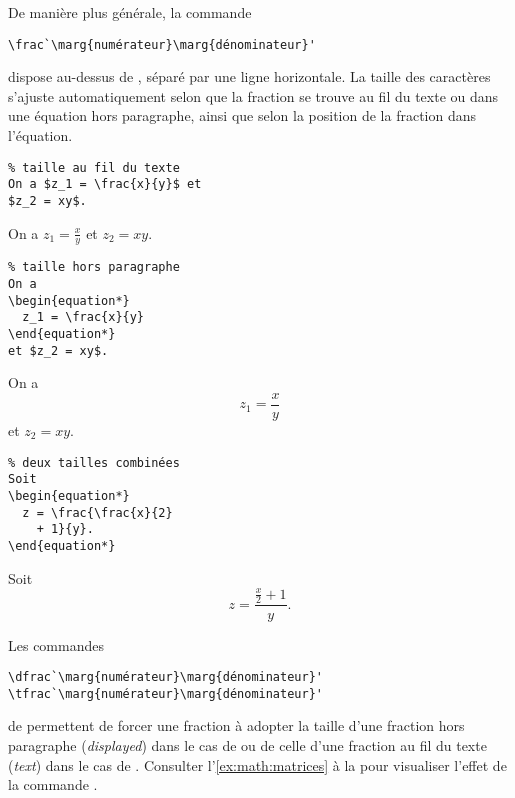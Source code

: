 De manière plus générale, la commande
\begin{lstlisting}
\frac`\marg{numérateur}\marg{dénominateur}'
\end{lstlisting}
dispose  au-dessus de , séparé par
une ligne horizontale. La taille des caractères s'ajuste
automatiquement selon que la fraction se trouve au fil du texte ou
dans une équation hors paragraphe, ainsi que selon la position de la
fraction dans l'équation.
\begin{demo}
  \begin{texample}
\begin{lstlisting}
% taille au fil du texte
On a $z_1 = \frac{x}{y}$ et
$z_2 = xy$.
\end{lstlisting}
    \producing On a $z_1 = \frac{x}{y}$ et $z_2 = xy$.
  \end{texample}

  \begin{texample}
\begin{lstlisting}
% taille hors paragraphe
On a
\begin{equation*}
  z_1 = \frac{x}{y}
\end{equation*}
et $z_2 = xy$.
\end{lstlisting}
    \producing On a
    \begin{equation*}
      z_1 = \frac{x}{y}
    \end{equation*}
    et $z_2 = xy$.
  \end{texample}

  \begin{texample}
\begin{lstlisting}
% deux tailles combinées
Soit
\begin{equation*}
  z = \frac{\frac{x}{2}
    + 1}{y}.
\end{equation*}
\end{lstlisting}
    \producing Soit
    \begin{equation*}
      z = \frac{\frac{x}{2} + 1}{y}.
    \end{equation*}
  \end{texample}
\end{demo}

Les commandes
\begin{lstlisting}
\dfrac`\marg{numérateur}\marg{dénominateur}'
\tfrac`\marg{numérateur}\marg{dénominateur}'
\end{lstlisting}
de  permettent de forcer une fraction à adopter la taille
d'une fraction hors paragraphe (\emph{displayed}) dans le cas de
\cmd{\dfrac} ou de celle d'une fraction au fil du texte (\emph{text})
dans le cas de \cmd{\tfrac}. Consulter l'\autoref{ex:math:matrices} à
la  pour visualiser l'effet de la
commande \cmd{\dfrac}.

